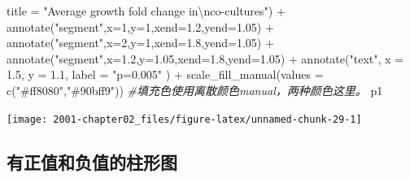 \documentclass[
]{book}
\newenvironment{Shaded}{\begin{snugshade}}{\end{snugshade}}
\newcommand{\AttributeTok}[1]{\textcolor[rgb]{0.77,0.63,0.00}{#1}}
\newcommand{\CommentTok}[1]{\textcolor[rgb]{0.56,0.35,0.01}{\textit{#1}}}
\newcommand{\DecValTok}[1]{\textcolor[rgb]{0.00,0.00,0.81}{#1}}
\newcommand{\FloatTok}[1]{\textcolor[rgb]{0.00,0.00,0.81}{#1}}
\newcommand{\FunctionTok}[1]{\textcolor[rgb]{0.00,0.00,0.00}{#1}}
\newcommand{\NormalTok}[1]{#1}
\newcommand{\SpecialCharTok}[1]{\textcolor[rgb]{0.00,0.00,0.00}{#1}}
\newcommand{\StringTok}[1]{\textcolor[rgb]{0.31,0.60,0.02}{#1}}
\begin{document}
\begin{Shaded}
\begin{Highlighting}[]
       \AttributeTok{title =} \StringTok{"Average growth fold change in}\SpecialCharTok{\textbackslash{}n}\StringTok{co{-}cultures"}\NormalTok{) }\SpecialCharTok{+}
  \FunctionTok{annotate}\NormalTok{(}\StringTok{"segment"}\NormalTok{,}\AttributeTok{x=}\DecValTok{1}\NormalTok{,}\AttributeTok{y=}\DecValTok{1}\NormalTok{,}\AttributeTok{xend=}\FloatTok{1.2}\NormalTok{,}\AttributeTok{yend=}\FloatTok{1.05}\NormalTok{) }\SpecialCharTok{+}
  \FunctionTok{annotate}\NormalTok{(}\StringTok{"segment"}\NormalTok{,}\AttributeTok{x=}\DecValTok{2}\NormalTok{,}\AttributeTok{y=}\DecValTok{1}\NormalTok{,}\AttributeTok{xend=}\FloatTok{1.8}\NormalTok{,}\AttributeTok{yend=}\FloatTok{1.05}\NormalTok{) }\SpecialCharTok{+} 
  \FunctionTok{annotate}\NormalTok{(}\StringTok{"segment"}\NormalTok{,}\AttributeTok{x=}\FloatTok{1.2}\NormalTok{,}\AttributeTok{y=}\FloatTok{1.05}\NormalTok{,}\AttributeTok{xend=}\FloatTok{1.8}\NormalTok{,}\AttributeTok{yend=}\FloatTok{1.05}\NormalTok{) }\SpecialCharTok{+} 
  \FunctionTok{annotate}\NormalTok{(}\StringTok{"text"}\NormalTok{, }\AttributeTok{x =} \FloatTok{1.5}\NormalTok{, }\AttributeTok{y =} \FloatTok{1.1}\NormalTok{, }\AttributeTok{label =} \StringTok{"p=0.005"}\NormalTok{ ) }\SpecialCharTok{+} 
  \FunctionTok{scale\_fill\_manual}\NormalTok{(}\AttributeTok{values =} \FunctionTok{c}\NormalTok{(}\StringTok{"\#ff8080"}\NormalTok{,}\StringTok{"\#90bff9"}\NormalTok{)) }\CommentTok{\#填充色使用离散颜色manual，两种颜色这里。}
\NormalTok{p1}
\end{Highlighting}
\end{Shaded}

\begin{center}\texttt{[image: 2001-chapter02\_files/figure-latex/unnamed-chunk-29-1]} \end{center}

\hypertarget{ux6709ux6b63ux503cux548cux8d1fux503cux7684ux67f1ux5f62ux56fe}{%
\subsection{有正值和负值的柱形图}\label{ux6709ux6b63ux503cux548cux8d1fux503cux7684ux67f1ux5f62ux56fe}}
\end{document}
